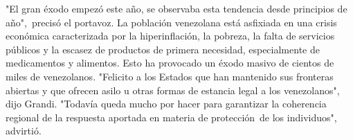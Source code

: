 \documentclass{article}%
\begin{document}
\newline%
%
"El gran éxodo empezó este año, se observaba esta tendencia desde principios de año",~precisó el portavoz.%
\newline%
%
La población venezolana está asfixiada en una crisis económica caracterizada por la hiperinflación, la pobreza, la falta de servicios públicos y la escasez de productos de primera necesidad, especialmente de medicamentos y alimentos. Esto ha provocado un éxodo masivo de cientos de miles de venezolanos.%
\newline%
%
"Felicito a los Estados que han mantenido sus fronteras abiertas y que ofrecen asilo u otras formas de estancia legal a los venezolanos", dijo Grandi. "Todavía queda mucho por hacer para garantizar la coherencia regional de la respuesta aportada en materia de protección~de los individuos", advirtió.%
\newline%
%
\end{document}
